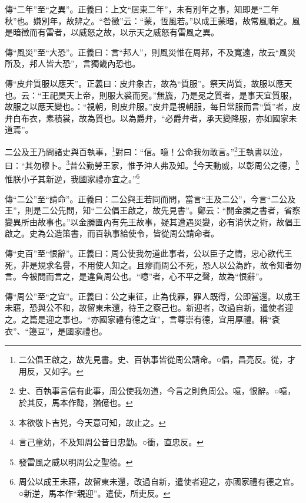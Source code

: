 {\noindent\zhuan{}\fzbyks 傳“二年”至“之異”。正義曰：上文“居東二年”，未有別年之事，知即是“二年秋”也。嫌別年，故辨之。“咎徵”云：“蒙，恆風若。”以成王蒙暗，故常風順之。風是暗徵而有雷者，以威怒之故，以示天之威怒有雷風之異。 \par}

{\noindent\zhuan{}\fzbyks 傳“風災”至“大恐”。正義曰：言“邦人”，則風災惟在周邦，不及寬遠，故云“風災所及，邦人皆大恐”，言獨畿內恐也。 \par}

{\noindent\zhuan{}\fzbyks 傳“皮弁質服以應天”。正義曰：皮弁象古，故為“質服”。祭天尚質，故服以應天也。云：“王祀昊天上帝，則服大裘而冕。”無旒，乃是冕之質者，是事天宜質服，故服之以應天變也。：“視朝，則皮弁服。”皮弁是視朝服，每日常服而言“質”者，皮弁白布衣，素積裳，故為質也。以為爵弁，“必爵弁者，承天變降服，亦如國家未道焉”。 \par}

二公及王乃問諸史與百執事，\footnote{二公倡王啟之，故先見書。史、百執事皆從周公請命。○倡，昌亮反。從，才用反，又如字。}對曰：“信。噫！公命我勿敢言。”\footnote{史、百執事言信有此事，周公使我勿道，今言之則負周公。噫，恨辭。○噫，於其反，馬本作懿，猶億也。}王執書以泣，曰：“其勿穆卜。\footnote{本欲敬卜吉兇，今天意可知，故止之。}昔公勤勞王家，惟予沖人弗及知。\footnote{言己童幼，不及知周公昔日忠勤。○衝，直忠反。}今天動威，以彰周公之德，\footnote{發雷風之威以明周公之聖德。}惟朕小子其新逆，我國家禮亦宜之。”\footnote{周公以成王未寤，故留東未還，改過自新，遣使者迎之，亦國家禮有德之宜。○新逆，馬本作“親迎”。遣使，所吏反。}

{\noindent\zhuan{}\fzbyks 傳“二公”至“請命”。正義曰：二公與王若同而問，當言“王及二公”，今言“二公及王”，則是二公先問，知“二公倡王啟之，故先見書”。鄭云：“開金縢之書者，省察變異所由故事也。”以金縢匱內有先王故事，疑其遭遇災變，必有消伏之術，故倡王啟之。史為公造策書，而百執事給使令，皆從周公請命者。 \par}

{\noindent\zhuan{}\fzbyks 傳“史百”至“恨辭”。正義曰：周公使我勿道此事者，公以臣子之情，忠心欲代王死，非是規求名譽，不用使人知之。且瘳而周公不死，恐人以公為詐，故令知者勿言。今被問而言之，是違負周公也。“噫”者，心不平之聲，故為“恨辭”。 \par}

{\noindent\zhuan{}\fzbyks 傳“周公”至“之宜”。正義曰：公之東征，止為伐罪，罪人既得，公即當還。以成王未寤，恐與公不和，故留東未還，待王之察己也。新迎者，改過自新，遣使者迎之。之篇是迎之事也。“亦國家禮有德之宜”，言尊崇有德，宜用厚禮。稱“袞衣”、“籩豆”，是國家禮也。 \par}

